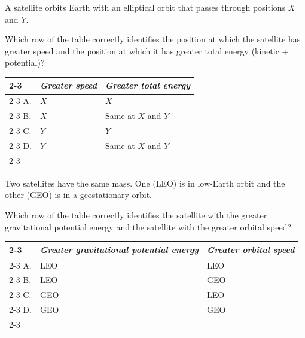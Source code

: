 \documentclass[12pt]{article}
\begin{document}
\begin{quizq}{}
A satellite orbits Earth with an elliptical orbit that passes through positions $X$ and $Y$.
\begin{center}
\end{center}
Which row of the table correctly identifies the position at which the satellite has greater speed
and the position at which it has greater total energy (kinetic + potential)?
\begin{center}
  \renewcommand\arraystretch{1.7}
  \begin{tabular}{@{}p{10mm}|>{\centering\arraybackslash}p{38mm}|>{\centering\arraybackslash}p{48mm}|}
    \cline{2-3}
    & \textit{Greater speed} & \textit{Greater total energy}\\ \cline{2-3}
    A. & $X$ & $X$\\ \cline{2-3}
    B. & $X$ & Same at $X$ and $Y$\\ \cline{2-3}
    C. & $Y$ & $Y$\\ \cline{2-3}
    D. & $Y$ & Same at $X$ and $Y$\\ \cline{2-3}
  \end{tabular}
\end{center}
\end{quizq}

\begin{quizq}{}
Two satellites have the same mass. One (LEO) is in low-Earth orbit and the other (GEO) is in a
geostationary orbit.

Which row of the table correctly identifies the satellite with the greater gravitational
potential energy and the satellite with the greater orbital speed?
\begin{center}
  \renewcommand\arraystretch{1.7}
  \begin{tabular}{@{}p{10mm}|>{\centering\arraybackslash}p{60mm}|>{\centering\arraybackslash}p{44mm}|}
    \cline{2-3}
    & \textit{Greater gravitational potential energy} & \textit{Greater orbital speed}\\ \cline{2-3}
    A. & LEO & LEO\\ \cline{2-3}
    B. & LEO & GEO\\ \cline{2-3}
    C. & GEO & LEO\\ \cline{2-3}
    D. & GEO & GEO\\ \cline{2-3}
  \end{tabular}
\end{center}
\end{quizq}
\end{document}
